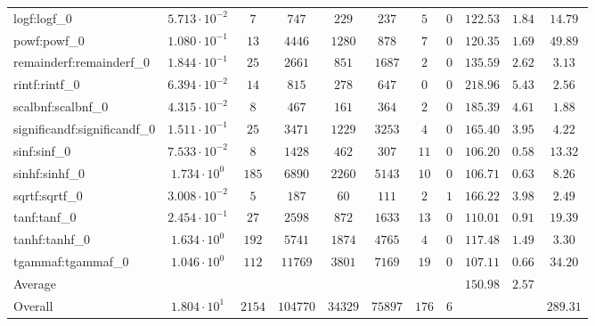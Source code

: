 \begin{tabular}{|l|c|c|c|c|c|c|c|c|c|c|}
logf:logf\_0                 & $ 5.713 \cdot 10^{-2} $ & $ 7      $ & $ 747    $ & $ 229   $ & $ 237   $ & $ 5   $ & $ 0 $ & $ 122.53      $ & $ 1.84    $ & $ 14.79   $ \\
powf:powf\_0                 & $ 1.080 \cdot 10^{-1} $ & $ 13     $ & $ 4446   $ & $ 1280  $ & $ 878   $ & $ 7   $ & $ 0 $ & $ 120.35      $ & $ 1.69    $ & $ 49.89   $ \\
remainderf:remainderf\_0     & $ 1.844 \cdot 10^{-1} $ & $ 25     $ & $ 2661   $ & $ 851   $ & $ 1687  $ & $ 2   $ & $ 0 $ & $ 135.59      $ & $ 2.62    $ & $ 3.13    $ \\
rintf:rintf\_0               & $ 6.394 \cdot 10^{-2} $ & $ 14     $ & $ 815    $ & $ 278   $ & $ 647   $ & $ 0   $ & $ 0 $ & $ 218.96      $ & $ 5.43    $ & $ 2.56    $ \\
scalbnf:scalbnf\_0           & $ 4.315 \cdot 10^{-2} $ & $ 8      $ & $ 467    $ & $ 161   $ & $ 364   $ & $ 2   $ & $ 0 $ & $ 185.39      $ & $ 4.61    $ & $ 1.88    $ \\
significandf:significandf\_0 & $ 1.511 \cdot 10^{-1} $ & $ 25     $ & $ 3471   $ & $ 1229  $ & $ 3253  $ & $ 4   $ & $ 0 $ & $ 165.40      $ & $ 3.95    $ & $ 4.22    $ \\
sinf:sinf\_0                 & $ 7.533 \cdot 10^{-2} $ & $ 8      $ & $ 1428   $ & $ 462   $ & $ 307   $ & $ 11  $ & $ 0 $ & $ 106.20      $ & $ 0.58    $ & $ 13.32   $ \\
sinhf:sinhf\_0               & $ 1.734 \cdot 10^{0}  $ & $ 185    $ & $ 6890   $ & $ 2260  $ & $ 5143  $ & $ 10  $ & $ 0 $ & $ 106.71      $ & $ 0.63    $ & $ 8.26    $ \\
sqrtf:sqrtf\_0               & $ 3.008 \cdot 10^{-2} $ & $ 5      $ & $ 187    $ & $ 60    $ & $ 111   $ & $ 2   $ & $ 1 $ & $ 166.22      $ & $ 3.98    $ & $ 2.49    $ \\
tanf:tanf\_0                 & $ 2.454 \cdot 10^{-1} $ & $ 27     $ & $ 2598   $ & $ 872   $ & $ 1633  $ & $ 13  $ & $ 0 $ & $ 110.01      $ & $ 0.91    $ & $ 19.39   $ \\
tanhf:tanhf\_0               & $ 1.634 \cdot 10^{0}  $ & $ 192    $ & $ 5741   $ & $ 1874  $ & $ 4765  $ & $ 4   $ & $ 0 $ & $ 117.48      $ & $ 1.49    $ & $ 3.30    $ \\
tgammaf:tgammaf\_0           & $ 1.046 \cdot 10^{0}  $ & $ 112    $ & $ 11769  $ & $ 3801  $ & $ 7169  $ & $ 19  $ & $ 0 $ & $ 107.11      $ & $ 0.66    $ & $ 34.20   $ \\
\hline
Average                      & $                     $ & $        $ & $        $ & $       $ & $       $ & $     $ & $   $ & $ 150.98      $ & $ 2.57    $ & $         $ \\
\hline
Overall                      & $ 1.804 \cdot 10^{1}  $ & $ 2154   $ & $ 104770 $ & $ 34329 $ & $ 75897 $ & $ 176 $ & $ 6 $ & $             $ & $         $ & $ 289.31  $ \\
\hline
\end{tabular}

